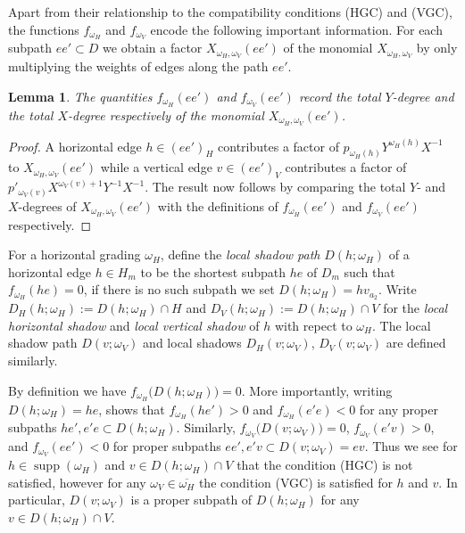 \documentclass{amsart}
\newtheorem{lemma}[theorem]{Lemma}
\newcommand{\supp}{\operatorname{supp}}
\begin{document}
Apart from their relationship to the compatibility conditions (HGC) and (VGC), the functions $f_{\omega_H}$ and $f_{\omega_V}$ encode the following important information.  For each subpath $ee'\subset D$ we obtain a factor $X_{\omega_H,\omega_V}(ee')$ of the monomial $X_{\omega_H,\omega_V}$ by only multiplying the weights of edges along the path $ee'$.
\begin{lemma}
  The quantities $f_{\omega_H}(ee')$ and $f_{\omega_V}(ee')$ record the total $Y$-degree and the total $X$-degree respectively of the monomial $X_{\omega_H,\omega_V}(ee')$.
\end{lemma}
\begin{proof}
  A horizontal edge $h\in(ee')_H$ contributes a factor of $p_{\omega_H(h)}Y^{\omega_H(h)}X^{-1}$ to $X_{\omega_H,\omega_V}(ee')$ while a vertical edge $v\in(ee')_V$ contributes a factor of $p'_{\omega_V(v)}X^{\omega_V(v)+1}Y^{-1}X^{-1}$.  The result now follows by comparing the total $Y$- and $X$-degrees of $X_{\omega_H,\omega_V}(ee')$ with the definitions of $f_{\omega_H}(ee')$ and $f_{\omega_V}(ee')$ respectively.
\end{proof}

For a horizontal grading $\omega_H$, define the \emph{local shadow path} $D(h;\omega_H)$ of a horizontal edge $h\in H_m$ to be the shortest subpath $he$ of $D_m$ such that $f_{\omega_H}(he)=0$, if there is no such subpath we set $D(h;\omega_H)=hv_{a_2}$.  Write $D_H(h;\omega_H):=D(h;\omega_H)\cap H$ and $D_V(h;\omega_H):=D(h;\omega_H)\cap V$ for the \emph{local horizontal shadow} and \emph{local vertical shadow} of $h$ with repect to $\omega_H$.  The local shadow path $D(v;\omega_V)$ and local shadows $D_H(v;\omega_V)$, $D_V(v;\omega_V)$ are defined similarly.

By definition we have $f_{\omega_H}\big(D(h;\omega_H)\big)=0$.  More importantly, writing $D(h;\omega_H)=he$, \cite[Lemma~4.8]{rupel2} shows that $f_{\omega_H}(he')>0$ and $f_{\omega_H}(e'e)<0$ for any proper subpaths $he',e'e\subset D(h;\omega_H)$.  Similarly, $f_{\omega_V}\big(D(v;\omega_V)\big)=0$, $f_{\omega_V}(e'v)>0$, and $f_{\omega_V}(ee')<0$ for proper subpaths $ee',e'v\subset D(v;\omega_V)=ev$.  Thus we see for $h\in\supp(\omega_H)$ and $v\in D(h;\omega_H)\cap V$ that the condition (HGC) is not satisfied, however for any $\omega_V\in\overline{\omega_H}$ the condition (VGC) is satisfied for $h$ and $v$.  In particular, $D(v;\omega_V)$ is a proper subpath of $D(h;\omega_H)$ for any $v\in D(h;\omega_H)\cap V$.
\end{document}
